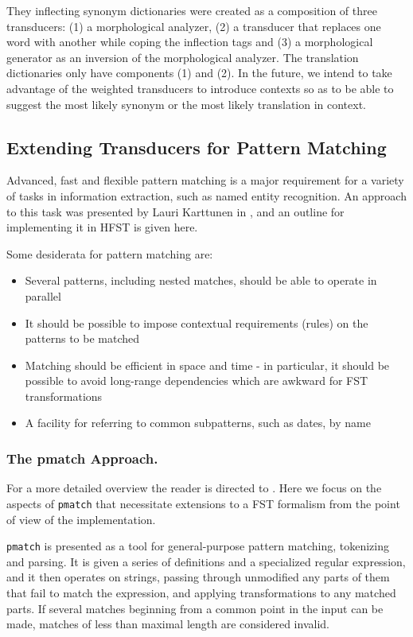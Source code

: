\documentclass{llncs}
\begin{document}
They inflecting synonym dictionaries were created as a composition of three transducers: (1) a morphological analyzer, (2) a transducer that replaces one word with another while coping the inflection tags and (3) a morphological generator as an inversion of the morphological analyzer. The translation dictionaries only have components (1) and (2). In the future, we intend to take advantage of the weighted transducers to introduce contexts so as to be able to suggest the most likely synonym or the most likely translation in context.

\subsection{Extending Transducers for Pattern Matching}

Advanced, fast and flexible pattern matching is a major requirement for a
variety of tasks in information extraction, such as named entity recognition.
An approach to this task was presented by Lauri Karttunen in
\cite{karttunen/2011}, and an outline for implementing it in HFST is given here.

Some desiderata for pattern matching are:

\begin{itemize}
\item Several patterns, including nested matches,
  should be able to operate in parallel
\item It should be possible to impose contextual requirements (rules) on
  the patterns to be matched
\item Matching should be efficient in space and time - in particular, it should
  be possible to avoid long-range
  dependencies which are awkward for FST transformations
\item A facility for referring to common subpatterns, such as dates, by name
\end{itemize}

\subsubsection{The pmatch Approach.}

For a more detailed overview the reader is directed to \cite{karttunen/2011}.
Here we focus on the aspects of \verb!pmatch! that necessitate extensions
to a FST formalism from the point of view of the implementation.

\verb!pmatch! is presented as a tool for general-purpose pattern matching,
tokenizing and parsing. It is given a series of definitions and a
specialized regular expression, and it then operates on strings, passing
through unmodified any parts of them that fail to match the expression,
and applying transformations to any matched parts. If several matches beginning
from a common point in the input can be made, matches of less than maximal
length are considered invalid.
\end{document}

